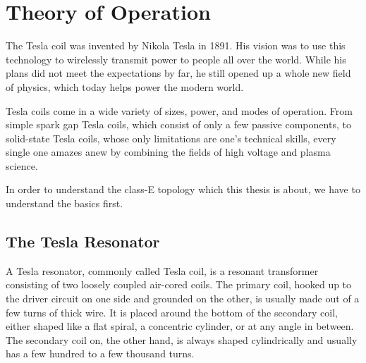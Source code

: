 \chapter{Theory of Operation} %

The Tesla coil was invented by Nikola Tesla in 1891. His vision was to use this technology to wirelessly transmit power to people all over the world. While his plans did not meet the expectations by far, he still opened up a whole new field of physics, which today helps power the modern world.

Tesla coils come in a wide variety of sizes, power, and modes of operation. From simple spark gap Tesla coils, which consist of only a few passive components, to solid-state Tesla coils, whose only limitations are one's technical skills, every single one amazes anew by combining the fields of high voltage and plasma science.

In order to understand the class-E topology which this thesis is about, we have to understand the basics first. 

\section{The Tesla Resonator}

A Tesla resonator, commonly called Tesla coil, is a resonant transformer consisting of two loosely coupled air-cored coils. The primary coil, hooked up to the driver circuit on one side and grounded on the other, is usually made out of a few turns of thick wire. It is placed around the bottom of the secondary coil, either shaped like a flat spiral, a concentric cylinder, or at any angle in between. The secondary coil on, the other hand, is always shaped cylindrically and usually has a few hundred to a few thousand turns.

